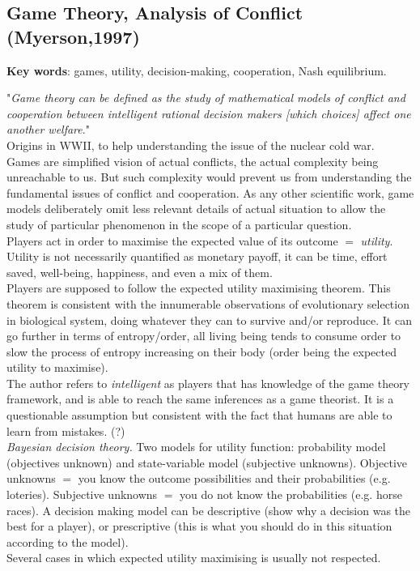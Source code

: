 \documentclass[12pt]{article}
\begin{document}
\subsection{Game Theory, Analysis of Conflict (Myerson,1997)}

\textbf{Key words}: games, utility, decision-making, cooperation, Nash equilibrium.

"\textit{Game theory can be defined as the study of mathematical models of conflict and cooperation between intelligent rational decision makers [which choices] affect one another welfare}."\\
Origins in WWII, to help understanding the issue of the nuclear cold war.\\
Games are simplified vision of actual conflicts, the actual complexity being unreachable to us. But such complexity would prevent us from understanding the fundamental issues of conflict and cooperation. As any other scientific work, game models deliberately omit less relevant details of actual situation to allow the study of particular phenomenon in the scope of a particular question.\\
Players act in order to maximise the expected value of its outcome $=$ \textit{utility}. Utility is not necessarily quantified as monetary payoff, it can be time, effort saved, well-being, happiness, and even a mix of them.\\
Players are supposed to follow the expected utility maximising theorem. This theorem is consistent with the innumerable observations of evolutionary selection in biological system, doing whatever they can to survive and/or reproduce. It can go further in terms of entropy/order, all living being tends to consume order to slow the process of entropy increasing on their body (order being the expected utility to maximise).\\
The author refers to \textit{intelligent} as players that has knowledge of the game theory framework, and is able to reach the same inferences as a game theorist. It is a questionable assumption but consistent with the fact that humans are able to learn from mistakes. (?)\\
\textit{Bayesian decision theory.} Two models for utility function: probability model (objectives unknown) and state-variable model (subjective unknowns). Objective unknowns $=$ you know the outcome possibilities and their probabilities (e.g. loteries). Subjective unknowns $=$ you do not know the probabilities (e.g. horse races).
A decision making model can be descriptive (show why a decision was the best for a player), or prescriptive (this is what you should do in this situation according to the model).\\
Several cases in which expected utility maximising is usually not respected.
\end{document}
